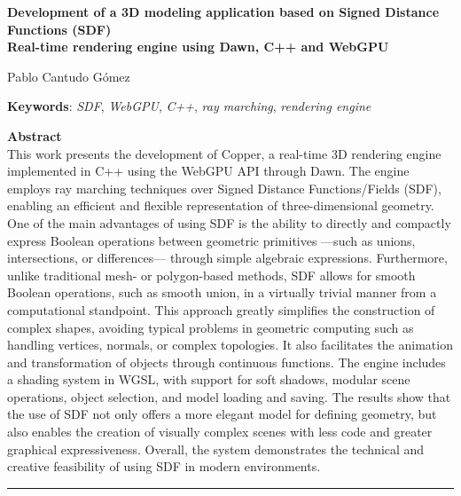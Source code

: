 \begin{center}
	{\large\bfseries Development of a 3D modeling application based on Signed Distance Functions (SDF) \\ Real-time rendering engine using Dawn, C++ and WebGPU}\\
\end{center}
\begin{center}
	Pablo Cantudo Gómez\\
\end{center}
\vspace{0.5cm}
\noindent\textbf{Keywords}: \textit{SDF}, \textit{WebGPU}, \textit{C++}, \textit{ray marching}, \textit{rendering engine}
\vspace{0.7cm}

\noindent\textbf{Abstract}\\
\break
This work presents the development of Copper, a real-time 3D rendering engine implemented in C++ using the WebGPU API through Dawn.
The engine employs ray marching techniques over Signed Distance Functions/Fields (SDF), enabling an efficient and flexible representation of three-dimensional geometry.
One of the main advantages of using SDF is the ability to directly and compactly express Boolean operations between geometric primitives ---such as unions, intersections, or differences--- through simple algebraic expressions.
Furthermore, unlike traditional mesh- or polygon-based methods, SDF allows for smooth Boolean operations, such as smooth union, in a virtually trivial manner from a computational standpoint.
\bigbreak
This approach greatly simplifies the construction of complex shapes, avoiding typical problems in geometric computing such as handling vertices, normals, or complex topologies.
It also facilitates the animation and transformation of objects through continuous functions.
The engine includes a shading system in WGSL, with support for soft shadows, modular scene operations, object selection, and model loading and saving.
The results show that the use of SDF not only offers a more elegant model for defining geometry, but also enables the creation of visually complex scenes with less code and greater graphical expressiveness.
Overall, the system demonstrates the technical and creative feasibility of using SDF in modern environments.

\cleardoublepage

\thispagestyle{empty}

\noindent\rule[-1ex]{\textwidth}{2pt}\\[4.5ex]

